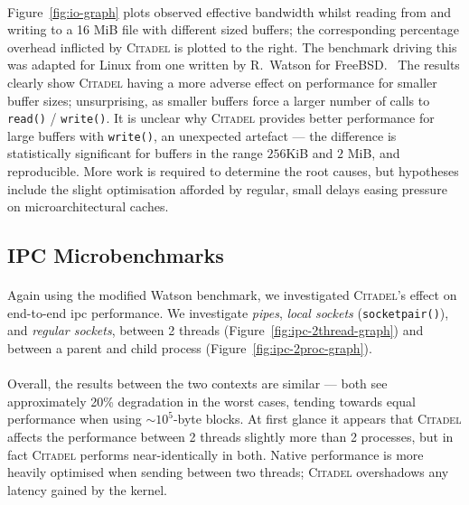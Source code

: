 \paragraph{} Figure~\ref{fig:io-graph} plots observed effective bandwidth whilst reading from and writing to a 16 MiB file with different sized buffers; the corresponding percentage overhead inflicted by \textsc{Citadel} is plotted to the right. The benchmark driving this was adapted for Linux from one written by R.~Watson for FreeBSD.~\cite{l41-benchmark} The results clearly show \textsc{Citadel} having a more adverse effect on performance for smaller buffer sizes; unsurprising, as smaller buffers force a larger number of calls to \texttt{read()} / \texttt{write()}. It is unclear why \textsc{Citadel} provides better performance for large buffers with \texttt{write()}, an unexpected artefact --- the difference is statistically significant for buffers in the range $256$KiB and $2$ MiB, and reproducible. More work is required to determine the root causes, but hypotheses include the slight optimisation afforded by regular, small delays easing pressure on microarchitectural caches.





\subsection{IPC Microbenchmarks}
\label{sec:ipc-microbenchmarks}

\paragraph{} Again using the modified Watson benchmark, we investigated \textsc{Citadel}'s effect on end-to-end \acrshort{ipc} performance. We investigate \textit{pipes}, \textit{local sockets} (\texttt{socketpair()}), and \textit{regular sockets}, between 2 threads (Figure~\ref{fig:ipc-2thread-graph}) and between a parent and child process (Figure~\ref{fig:ipc-2proc-graph}).

\paragraph{} Overall, the results between the two contexts are similar --- both see approximately 20\% degradation in the worst cases, tending towards equal performance when using $\sim 10^5$-byte blocks. At first glance it appears that \textsc{Citadel} affects the performance between 2 threads slightly more than 2 processes, but in fact \textsc{Citadel} performs near-identically in both. Native performance is more heavily optimised when sending between two threads; \textsc{Citadel} overshadows any latency gained by the kernel.

